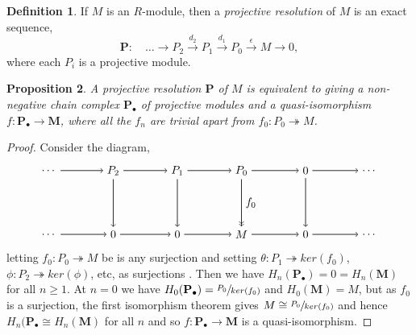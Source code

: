 \documentclass[11.5pt, twoside, a4paper, titlepage]{report}
\theoremstyle{definition}
\newtheorem{mydef}{Definition}[section]
\theoremstyle{plain}
\newtheorem{prop}[mydef]{Proposition}
\begin{document}
\begin{mydef}
If $M$ is an $R$-module, then a \emph{projective resolution} of $M$ is an exact sequence, 
\begin{equation*}
\mathbf{P}: \quad \dots \xrightarrow{} P_2 \xrightarrow{d_2} P_1 \xrightarrow{d_1} P_0 \xrightarrow{\epsilon} M \xrightarrow{} 0,
\end{equation*}
where each $P_i$ is a projective module.
\end{mydef}

\begin{prop}
A projective resolution $\mathbf{P}$ of $M$ is equivalent to giving a non-negative chain complex $\mathbf{P}_{\bullet}$ of projective modules and a quasi-isomorphism $f: \mathbf{P}_{\bullet} \to \mathbf{M}$, where all the $f_n$ are trivial apart from $f_0: P_0 \twoheadrightarrow M$.
\end{prop}
\begin{proof}
Consider the diagram,
\begin{equation*}
\begin{tikzpicture}[->,-latex, auto, main path/.style={->, semithick}, main node/.style={}]
\node	[main node]		(2) at (2,0)		{$\dots$};
\node	[main node]		(3) at (4,0)		{$P_2$};
\node [main node]		(4) at (6,0)		{$P_1$};
\node [main node]		(5) at (8,0)		{$P_0$};
\node	[main node]		(11) at (10,0)	{$0$};
\node [main node] 		(12) at (12,0)	{$\dots$};

\node	[main node]		(7) at (2,-2)		{$\dots$};
\node	[main node]		(8) at (4,-2)		{$0$};
\node [main node]		(9) at (6,-2)		{$0$};
\node [main node]		(10) at (8,-2)	{$M$};
\node [main node]		(13) at (10,-2)	{$0$};
\node [main node]		(14) at (12, -2)	{$\dots$};

\draw (2) edge [main path] node [auto] {$$} (3);
\draw (3) edge [main path] node [auto] {$$} (4);
\draw (4) edge [main path] node [auto] {$$} (5);
\draw (5) edge [main path] (11);
\draw (11) edge [main path] (12);

\draw (7) edge [main path] node [auto] {$$} (8);
\path (8) edge [main path] node [auto] {$$} (9);
\draw (9) edge [main path] node [auto, swap] {$$} (10);
\draw (10) edge [main path] (13);
\draw (13) edge [main path] (14);

\draw (3) edge [main path] node [auto] {$$} (8);
\draw (4) edge [main path] node [auto] {$$} (9);
\draw (5) edge [->>, semithick] node [auto] {$f_0$} (10);
\draw (11) edge [main path] (13);
\end{tikzpicture}
\end{equation*}
letting $f_0: P_0 \twoheadrightarrow M$ be is any surjection and setting $\theta: P_1 \twoheadrightarrow ker(f_0)$, $\phi: P_2 \twoheadrightarrow ker(\phi)$, etc, as surjections . Then we have $H_n(\mathbf{P}_{\bullet})=0=H_n(\mathbf{M})$ for all $n\geq 1$. At $n=0$ we have $H_0(\mathbf{P}_{\bullet})=\sfrac{P_0}{ker(f_0)}$ and $H_0(\mathbf{M})=M$, but as $f_0$ is a surjection, the first isomorphism theorem gives $M\cong \sfrac{P_0}{ker(f_0)}$ and hence $H_n(\mathbf{P}_{\bullet} \cong H_n(\mathbf{M})$ for all $n$ and so $f: \mathbf{P}_{\bullet} \to \mathbf{M}$ is a quasi-isomorphism.
\end{proof}
\end{document}

